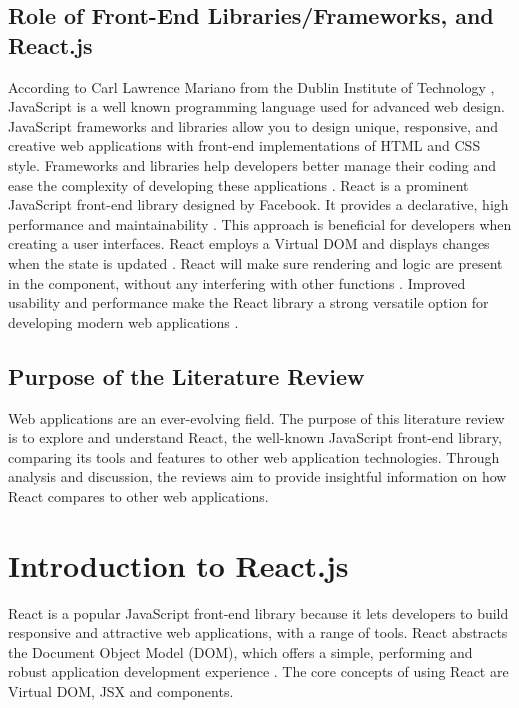 \documentclass[10pt,journal,compsoc]{IEEEtran}
\begin{document}
\subsection{Role of Front-End Libraries/Frameworks, and React.js}
According to Carl Lawrence Mariano from the Dublin Institute of Technology \cite{mariano2017benchmarking}, JavaScript is a well known programming language used for advanced web design. JavaScript frameworks and libraries allow you to design unique, responsive, and creative web applications with front-end implementations of HTML and CSS style\cite{mariano2017benchmarking}. Frameworks and libraries help developers better manage their coding and ease the complexity of developing these applications \cite{mariano2017benchmarking}. React is a prominent JavaScript front-end library designed by Facebook. It provides a declarative, high performance and maintainability \cite{chen2019front}. This approach is beneficial for developers when creating a user interfaces. React employs a Virtual DOM and displays changes when the state is updated \cite{chen2019front}. React will make sure rendering and logic are present in the component, without any interfering with other functions \cite{chen2019front}. Improved usability and performance make the React library a strong versatile option for developing modern web applications \cite{chen2019front}.


\subsection{ Purpose of the Literature Review}
Web applications are an ever-evolving field. The purpose of this literature review is to explore and understand React, the well-known JavaScript front-end library, comparing its tools and features to other web application technologies. Through analysis and discussion, the reviews aim to provide insightful information on how React compares to other web applications.

\section{Introduction to React.js}
React is a popular JavaScript front-end library because it lets developers to build responsive and attractive web applications, with a range of tools. React abstracts the Document Object Model (DOM), which offers a simple, performing and robust application development experience \cite{aggarwal2018modern}. The core concepts of using React are Virtual DOM, JSX and components.
\end{document}
